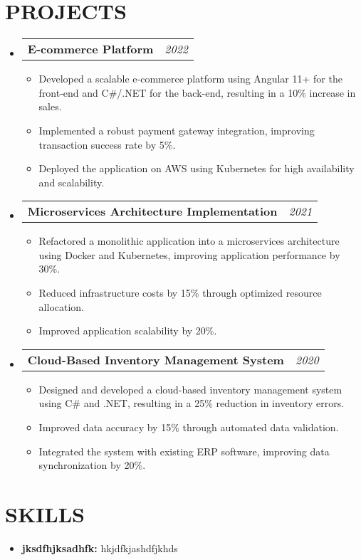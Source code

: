 \documentclass[letterpaper,11pt]{article}
\makeatletter
\newcommand{\resumeItem}[1]{\item\small{{#1 \vspace{-3pt}}}}
\newcommand{\resumeProjectHeading}[2]{\item\begin{tabular*}{0.97\textwidth}{l@{\extracolsep{\fill}}r}\small#1 & #2 \\\end{tabular*}\vspace{-7pt}}
\newcommand{\resumeSubHeadingListStart}{\begin{itemize}[leftmargin=0.15in, label={}]}
\newcommand{\resumeSubHeadingListEnd}{\end{itemize}}
\newcommand{\resumeItemListStart}{\begin{itemize}}
\newcommand{\resumeItemListEnd}{\end{itemize}\vspace{-5pt}}
\makeatother
\begin{document}
\section{{\fontsize{9pt}{20pt}\selectfont \textbf{PROJECTS}}}
\resumeSubHeadingListStart
\resumeProjectHeading{\textbf{E-commerce Platform}}{\textit{2022}}
\resumeItemListStart
\resumeItem{Developed a scalable e-commerce platform using Angular 11+ for the front-end and C\#/.NET for the back-end, resulting in a 10\% increase in sales.}
\resumeItem{Implemented a robust payment gateway integration, improving transaction success rate by 5\%.}
\resumeItem{Deployed the application on AWS using Kubernetes for high availability and scalability.}
\resumeItemListEnd\vspace{-6pt}
\resumeProjectHeading{\textbf{Microservices Architecture Implementation}}{\textit{2021}}
\resumeItemListStart
\resumeItem{Refactored a monolithic application into a microservices architecture using Docker and Kubernetes, improving application performance by 30\%.}
\resumeItem{Reduced infrastructure costs by 15\% through optimized resource allocation.}
\resumeItem{Improved application scalability by 20\%.}
\resumeItemListEnd\vspace{-6pt}
\resumeProjectHeading{\textbf{Cloud-Based Inventory Management System}}{\textit{2020}}
\resumeItemListStart
\resumeItem{Designed and developed a cloud-based inventory management system using C\# and .NET, resulting in a 25\% reduction in inventory errors.}
\resumeItem{Improved data accuracy by 15\% through automated data validation.}
\resumeItem{Integrated the system with existing ERP software, improving data synchronization by 20\%.}
\resumeItemListEnd
\resumeSubHeadingListEnd
\vspace{-17pt}

\section{{\fontsize{9pt}{20pt}\selectfont \textbf{SKILLS}}}
\resumeSubHeadingListStart
\resumeItem{\textbf{jksdfhjksadhfk:} hkjdfkjashdfjkhds}
\resumeSubHeadingListEnd
\vspace{-10pt}
\end{document}
